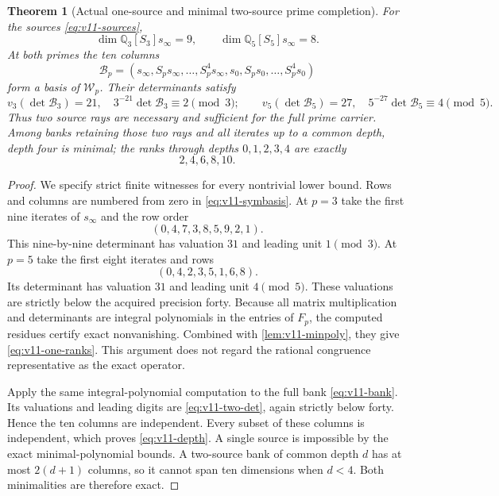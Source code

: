 \documentclass[11pt]{article}
\newtheorem{theorem}{Theorem}[section]
\theoremstyle{definition}
\theoremstyle{remark}
\newcommand{\Q}{\mathbb Q}
\begin{document}
\begin{theorem}[Actual one-source and minimal two-source prime completion]
\label{thm:v11-two-sources}
For the sources \cref{eq:v11-sources},
\begin{equation}
 \boxed{
 \dim\Q_3[S_3]s_\infty=9,\qquad
 \dim\Q_5[S_5]s_\infty=8.}
 \label{eq:v11-one-ranks}
\end{equation}
At both primes the ten columns
\begin{equation}
 \boxed{
 \mathscr B_p=
 (s_\infty,S_ps_\infty,\ldots,S_p^4s_\infty,
  s_0,S_ps_0,\ldots,S_p^4s_0)
 }
 \label{eq:v11-bank}
\end{equation}
form a basis of $\mathcal W_p$. Their determinants satisfy
\begin{equation}
 \boxed{
 v_3(\det\mathscr B_3)=21,\quad
 3^{-21}\det\mathscr B_3\equiv2\pmod3;
 \qquad
 v_5(\det\mathscr B_5)=27,\quad
 5^{-27}\det\mathscr B_5\equiv4\pmod5.}
 \label{eq:v11-two-det}
\end{equation}
Thus two source rays are necessary and sufficient for the full prime
carrier. Among banks retaining those two rays and all iterates up to a
common depth, depth four is minimal; the ranks through depths
$0,1,2,3,4$ are exactly
\begin{equation}
 \boxed{2,4,6,8,10.}
 \label{eq:v11-depth}
\end{equation}
\end{theorem}
\begin{proof}
We specify strict finite witnesses for every nontrivial lower bound.
Rows and columns are numbered from zero in \cref{eq:v11-symbasis}.
At $p=3$ take the first nine iterates of $s_\infty$ and the row order
\[
 (0,4,7,3,8,5,9,2,1).
\]
This nine-by-nine determinant has valuation $31$ and leading unit
$1\pmod3$. At $p=5$ take the first eight iterates and rows
\[
 (0,4,2,3,5,1,6,8).
\]
Its determinant has valuation $31$ and leading unit $4\pmod5$.
These valuations are strictly below the acquired precision forty.
Because all matrix multiplication and determinants are integral
polynomials in the entries of $F_p$, the computed residues certify
exact nonvanishing. Combined with \cref{lem:v11-minpoly}, they give
\cref{eq:v11-one-ranks}. This argument does not regard the rational
congruence representative as the exact operator.

Apply the same integral-polynomial computation to the full bank
\cref{eq:v11-bank}. Its valuations and leading digits are
\cref{eq:v11-two-det}, again strictly below forty. Hence the ten
columns are independent. Every subset of these columns is independent,
which proves \cref{eq:v11-depth}. A single source is impossible by
the exact minimal-polynomial bounds. A two-source bank of common depth
$d$ has at most $2(d+1)$ columns, so it cannot span ten dimensions
when $d<4$. Both minimalities are therefore exact.
\end{proof}
\end{document}

